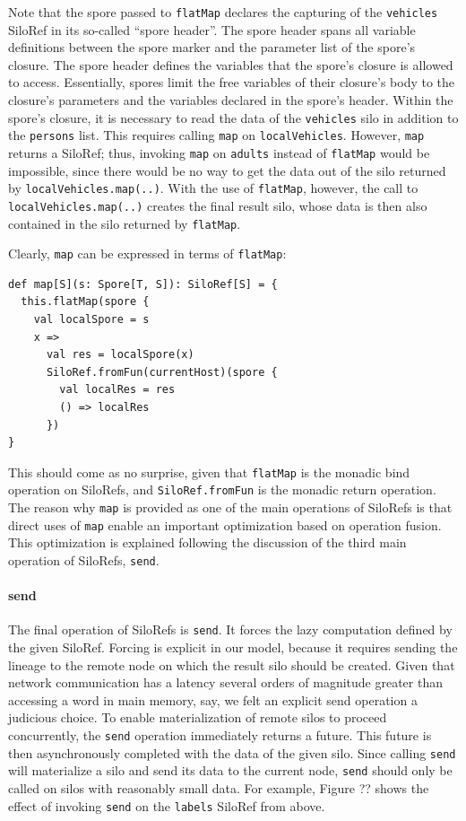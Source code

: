 \documentclass{sigplanconf}
\theoremstyle{definition}
\theoremstyle{definition}
\begin{document}
Note that the spore passed to \verb|flatMap| declares the capturing of the
\verb|vehicles| SiloRef in its so-called ``spore header''. The spore header
spans all variable definitions between the spore marker and the parameter list
of the spore's closure. The spore header defines the variables that the
spore's closure is allowed to access. Essentially, spores limit the free
variables of their closure's body to the closure's parameters and the
variables declared in the spore's header. Within the spore's closure, it is
necessary to read the data of the \verb|vehicles| silo in addition to the
\verb|persons| list. This requires calling \verb|map| on \verb|localVehicles|.
However, \verb|map| returns a SiloRef; thus, invoking \verb|map| on
\verb|adults| instead of \verb|flatMap| would be impossible, since there would
be no way to get the data out of the silo returned by
\verb|localVehicles.map(..)|. With the use of \verb|flatMap|, however, the
call to \verb|localVehicles.map(..)| creates the final result silo, whose data
is then also contained in the silo returned by \verb|flatMap|.

Clearly, \verb|map| can be expressed in terms of \verb|flatMap|:

\begin{lstlisting}
def map[S](s: Spore[T, S]): SiloRef[S] = {
  this.flatMap(spore {
    val localSpore = s
    x =>
      val res = localSpore(x)
      SiloRef.fromFun(currentHost)(spore {
        val localRes = res
        () => localRes
      })
}
\end{lstlisting}

This should come as no surprise, given that \verb|flatMap| is the monadic bind
operation on SiloRefs, and \verb|SiloRef.fromFun| is the monadic return
operation. The reason why \verb|map| is provided as one of the main operations
of SiloRefs is that direct uses of \verb|map| enable an important optimization
based on operation fusion. This optimization is explained following the
discussion of the third main operation of SiloRefs, \verb|send|.

\paragraph{send}
The final operation of SiloRefs is \verb|send|. It forces the lazy computation
defined by the given SiloRef. Forcing is explicit in our model, because it
requires sending the lineage to the remote node on which the result silo
should be created. Given that network communication has a latency several
orders of magnitude greater than accessing a word in main memory, say, we felt
an explicit send operation a judicious choice. To enable materialization of
remote silos to proceed concurrently, the \verb|send| operation immediately
returns a future. This future is then asynchronously completed with the data
of the given silo. Since calling \verb|send| will materialize a silo and send
its data to the current node, \verb|send| should only be called on silos with
reasonably small data. For example, Figure ?? shows the effect of invoking
\verb|send| on the \verb|labels| SiloRef from above.
\end{document}
